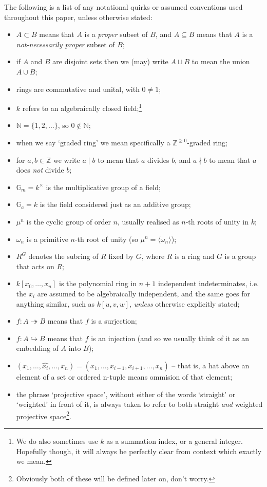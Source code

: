 \documentclass[10pt,notitlepage]{article}
\numberwithin{equation}{subsection}
\newcommand{\gm}{\mathbb{G}_m}
\newcommand{\ga}{\mathbb{G}_a}
\newcommand{\bb}[1]{\mathbb{#1}}
\newcommand{\remove}[1]{\widehat{#1}}
\newcommand{\zz}{\mathbb{Z}}
\begin{document}
        The following is a list of any notational quirks or assumed conventions used throughout this paper, unless otherwise stated:
        \begin{itemize}
            \item $A\subset B$ means that $A$ is a \emph{proper} subset of $B$, and $A\subseteq B$ means that $A$ is a \emph{not-necessarily proper} subset of $B$;
            \item if $A$ and $B$ are disjoint sets then we (may) write $A\sqcup B$ to mean the union $A\cup B$;
            \item rings are commutative and unital, with $0\neq1$;
            \item $k$ refers to an algebraically closed field;\footnote{%
                We do also sometimes use $k$ as a summation index, or a general integer.
                Hopefully though, it will always be perfectly clear from context which exactly we mean.
            }
            \item $\bb{N}=\{1,2,\ldots\}$, so $0\not\in\bb{N}$;
            \item when we say `graded ring' we mean specifically a $\zz^{\geqslant0}$-graded ring;
            \item for $a,b\in\zz$ we write $a\mid b$ to mean that $a$ divides $b$, and $a\nmid b$ to mean that $a$ does \emph{not} divide $b$;
            \item $\gm=k^{\times}$ is the multiplicative group of a field;
            \item $\ga=k$ is the field considered just as an additive group;
            \item $\mu^n$ is the cyclic group of order $n$, usually realised as $n$-th roots of unity in $k$;
            \item $\omega_n$ is a primitive $n$-th root of unity (so $\mu^n=\langle\omega_n\rangle$);
            \item $R^G$ denotes the subring of $R$ fixed by $G$, where $R$ is a ring and $G$ is a group that acts on $R$;
            \item $k[x_0,\ldots,x_n]$ is the polynomial ring in $n+1$ independent indeterminates, i.e. the $x_i$ are assumed to be algebraically independent, and the same goes for anything similar, such as $k[u,v,w]$, \emph{unless} otherwise explicitly stated;
            \item $f\colon A\twoheadrightarrow B$ means that $f$ is a surjection;
            \item $f\colon A\hookrightarrow B$ means that $f$ is an injection (and so we usually think of it as an embedding of $A$ into $B$);
            \item $(x_1,\ldots,\remove{x_i},\ldots,x_n)=(x_1,\ldots,x_{i-1},x_{i+1},\ldots,x_n)$ -- that is, a hat above an element of a set or ordered n-tuple means ommision of that element;
            \item the phrase `projective space', without either of the words `straight' or `weighted' in front of it, is always taken to refer to both straight \emph{and} weighted projective space\footnote{Obviously both of these will be defined later on, don't worry.}.
        \end{itemize}
\end{document}
